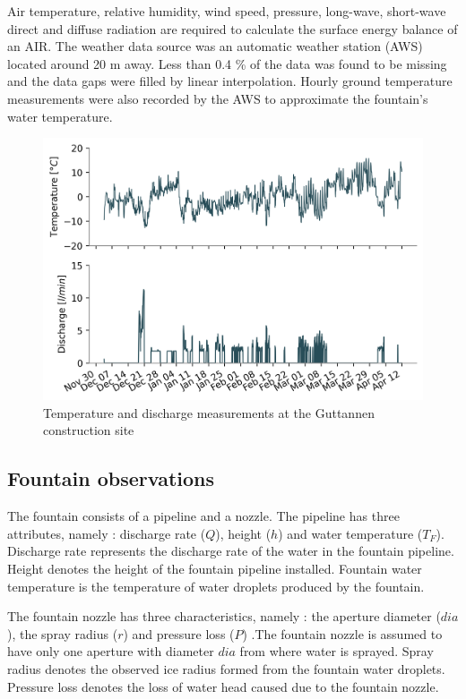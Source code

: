 \documentclass[tc, manuscript]{copernicus}
\begin{document}
Air temperature, relative humidity, wind speed, pressure, long-wave, short-wave direct and diffuse radiation are
required to calculate the surface energy balance of an AIR.  The weather data source was an automatic weather
station (AWS) located around 20 m away. Less than 0.4 \% of the data was found to be missing and the data gaps
were filled by linear interpolation. Hourly ground temperature measurements were also recorded by the AWS to
approximate the fountain's water temperature. 

\begin{figure}[t]
\includegraphics[width=12cm]{Figures/disvstemp.png}
\caption{Temperature and discharge measurements at the Guttannen construction site}
\label{fig:aws} 
\end{figure}


\subsection{Fountain observations}

The fountain consists of a pipeline and a nozzle. The pipeline has three attributes, namely : discharge rate
($Q$), height ($h$) and water temperature ($T_F$). Discharge rate represents the discharge rate of the water in
the fountain pipeline. Height denotes the height of the fountain pipeline installed. Fountain water temperature
is the temperature of water droplets produced by the fountain.

The fountain nozzle has three characteristics, namely : the aperture diameter ($dia$), the spray radius ($r$)
and pressure loss ($P$) .The fountain nozzle is assumed to have only one aperture with diameter $dia$ from where
water is sprayed. Spray radius denotes the observed ice radius formed from the fountain water droplets.
Pressure loss denotes the loss of water head caused due to the fountain nozzle.
\end{document}
